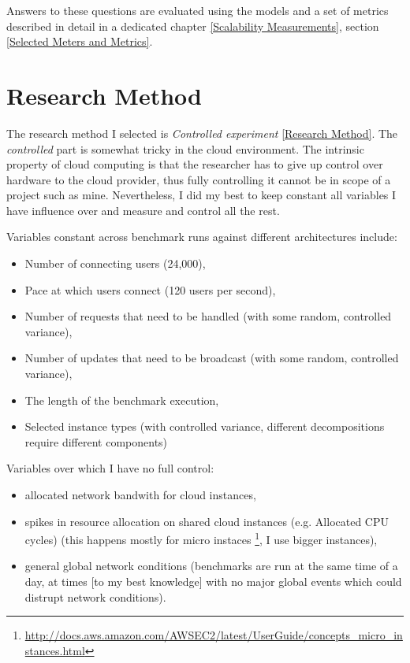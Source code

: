\documentclass{uvamscse}
\begin{document}
Answers to these questions are evaluated using the models and a set of metrics described in detail in a dedicated chapter \ref{Scalability Measurements}, section \ref{Selected Meters and Metrics}.

\section{Research Method}
The research method I selected is \textit{Controlled experiment} \ref{Research Method}. The \textit{controlled} part is somewhat tricky in the cloud environment. The intrinsic property of cloud computing is that the researcher has to give up control over hardware to the cloud provider, thus fully controlling it cannot be in scope of a project such as mine. Nevertheless, I did my best to keep constant all variables I have influence over and measure and control all the rest.

Variables constant across benchmark runs against different architectures include:
\begin{itemize}
  \item Number of connecting users (24,000),
  \item Pace at which users connect (120 users per second),
  \item Number of requests that need to be handled (with some random, controlled variance),
  \item Number of updates that need to be broadcast (with some random, controlled variance),
  \item The length of the benchmark execution,
  \item Selected instance types (with controlled variance, different decompositions require different components)
\end{itemize}

Variables over which I have no full control:
\begin{itemize}
  \item allocated network bandwith for cloud instances,
  \item spikes in resource allocation on shared cloud instances (e.g. Allocated CPU cycles) (this happens mostly for micro instaces \footnote{\url{http://docs.aws.amazon.com/AWSEC2/latest/UserGuide/concepts\_micro\_instances.html}}, I use bigger instances),
  \item general global network conditions (benchmarks are run at the same time of a day, at times [to my best knowledge] with no major global events which could distrupt network conditions).
\end{itemize}
\end{document}
